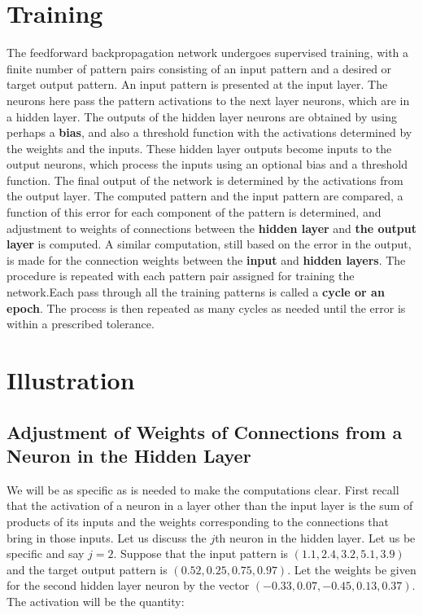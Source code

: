 \documentclass[12pt, right open]{memoir}
\begin{document}
\section{Training}

The feedforward backpropagation network undergoes supervised training, with
a finite number of pattern pairs consisting of an input pattern and a desired or
target output pattern. An input pattern is presented at the input layer. The
neurons here pass the pattern activations to the next layer neurons, which are
in a hidden layer. The outputs of the hidden layer neurons are obtained by
using perhaps a \textbf{bias}, and also a threshold function with the activations
determined by the weights and the inputs. These hidden layer outputs become
inputs to the output neurons, which process the inputs using an optional bias
and a threshold function. The final output of the network is determined by the
activations from the output layer.
The computed pattern and the input pattern are compared, a function of this
error for each component of the pattern is determined, and adjustment to
weights of connections between the \textbf{hidden layer} and \textbf{the output layer} is
computed. A similar computation, still based on the error in the output, is
made for the connection weights between the \textbf{input} and \textbf{hidden layers}. The
procedure is repeated with each pattern pair assigned for training the network.Each pass through all the training patterns is called a \textbf{cycle or an epoch}. The
process is then repeated as many cycles as needed until the error is within a
prescribed tolerance.

\section{Illustration}
\subsection{Adjustment of Weights of Connections from a Neuron in
the Hidden Layer}

We will be as specific as is needed to make the computations clear. First recall that the activation of a neuron in a layer other than the input layer is the sum of products of its inputs and the weights corresponding to the connections that bring in those inputs. Let us discuss the $j$th neuron in the hidden layer. Let us be specific and say $j = 2$. Suppose that the input pattern is $(1.1, 2.4, 3.2, 5.1, 3.9)$ and the target output pattern is $(0.52, 0.25, 0.75, 0.97)$. Let the weights be given for the second hidden layer
neuron by the vector $(-0.33, 0.07, -0.45, 0.13, 0.37)$. The activation will be the quantity:\\
\end{document}
